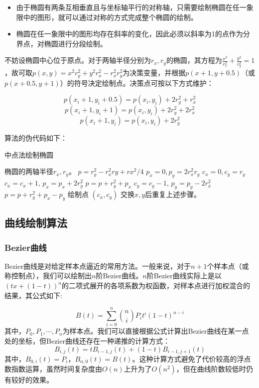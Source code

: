 \documentclass[a4paper,12pt]{article}
\begin{document}
\begin{itemize}
	\item 由于椭圆有两条互相垂直且与坐标轴平行的对称轴，只需要绘制椭圆在任一象限中的图形，就可以通过对称的方式完成整个椭圆的绘制。
	\item 椭圆在任一象限中的图形均存在斜率的变化，因此必须以斜率为1的点作为分界点，对椭圆进行分段绘制。
\end{itemize}
不妨设椭圆中心位于原点。对于两轴半径分别为$r_x,r_y$的椭圆，其方程为$\frac{x^2}{r_x^2} + \frac{y^2}{r_y^2} = 1$，故可取$p(x, y) = x^2r_y^2 + y^2 r_x^2 - r_x^2r_y^2$为决策变量，并根据$p(x+1, y+0.5)$（或$p(x+0.5, y+1)$）的符号决定绘制点。决策点可按以下方式维护：

$$ p(x_i+1, y_i+0.5) = p(x_i, y_i) + 2r_y^2 + r_x^2 $$
$$ p(x_i+1, y_i+1) = p(x_i, y_i) + 2r_y^2 + 2r_x^2 $$
$$ p(x_i+1, y_i) = p(x_i, y_i) + 2r_y^2 $$

算法的伪代码如下：

\begin{algorithm}[htb] 
	\caption{中点法绘制椭圆} 
	\label{alg:Midpoint} 
	\begin{algorithmic}[1] 
		\Require 
		椭圆的两轴半径$r_x, r_y$。
		\State $p = r_y^2 - r_x^2 ry + rx^2 / 4$
		\State $p_x = 0, p_y = 2r_x^2r_y$
		\State $c_x = 0, c_y = r_y$
		\State $c_x = c_x + 1$, $p_x = p_x + 2 r_y^2$ 
		\State $p = p + r_y^2 + p_x$
		\Else
		\State $c_y = c_y - 1$, $p_y = p_y - 2 r_x^2$
		\State $p = p + r_y^2 + p_x - p_y$
		\EndIf
		\State 绘制点 $(c_x, c_y)$
		\EndFor
		\State 交换$x, y$后重复上述步骤。
	\end{algorithmic} 
\end{algorithm}

\subsection{曲线绘制算法}
\subsubsection{Bezier曲线}
Bezier曲线是对给定样本点逼近的常用方法。一般来说，对于$n+1$个样本点（或称控制点），我们可以绘制出$n$阶Bezier曲线。$n$阶Bezier曲线实际上是以$(tx+(1-t))^n$的二项式展开的各项系数为权函数，对样本点进行加权混合的结果，其公式如下:

$$ B(t) = \sum_{i=0}^n \binom{n}{i} P_i t^i (1-t)^{n-i} $$
其中，$P_0, P_1, \cdots, P_n$为样本点。我们可以直接根据公式计算出Bezier曲线在某一点处的坐标，但Bezier曲线还存在一种递推的计算方式：
$$ B_{i, j}(t) = t B_{i-1, j}(t) + (1-t) B_{i-1, j+1}(t) $$
其中，$B_{0, i}(t) = P_i$，$B_{n, 0}(t) = B(t)$。这种计算方式避免了代价较高的浮点数指数运算，虽然时间复杂度由$O(n)$上升为了$O(n^2)$，但在曲线阶数较低时仍有较好的效果。
\end{document}
